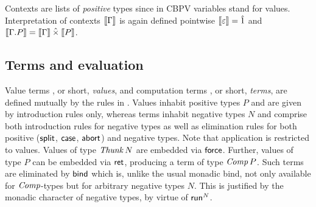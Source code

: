 \documentclass[sigplan,screen,fleqn,review]{acmart} %
\begin{document}
Contexts are lists of \emph{positive} types since in CBPV variables stand
for values.  Interpretation of contexts $\mathopen{{[\kern-0.14em[}} \Gamma \mathclose{{]\kern-0.14em]}}$ is again defined
pointwise $\mathopen{{[\kern-0.14em[}} \varepsilon \mathclose{{]\kern-0.14em]}} = \hat{1}$ and
$\mathopen{{[\kern-0.14em[}} \Gamma.P \mathclose{{]\kern-0.14em]}} = \mathopen{{[\kern-0.14em[}} \Gamma \mathclose{{]\kern-0.14em]}} \mathbin{\hat\times} \mathopen{{[\kern-0.14em[}} P \mathclose{{]\kern-0.14em]}}$.

\subsection{Terms and evaluation}

Value terms , or short, \emph{values},
and computation terms , or short,
\emph{terms}, are defined mutually by the rules in .
Values inhabit positive types $P$ and are given by introduction rules
only, whereas terms inhabit negative types $N$ and comprise both
introduction rules for negative types as well as elimination rules for
both positive ($\mathsf{split}$, $\mathsf{case}$, $\mathsf{abort}$)
and negative types.
%
%
Note
that application is restricted to values.  Values of type
$\mathit{Thunk}\,N$ are embedded via $\mathsf{force}$.
Further, values of type $P$ can be embedded
via $\mathsf{ret}$, producing a term of type $\mathit{Comp}\,P$.  Such terms are
eliminated by $\mathsf{bind}$ which is, unlike the usual monadic bind, not
only available for $\mathit{Comp}$-types but for arbitrary negative types
$N$.  This is justified by the monadic character of negative
types, by virtue of $\mathsf{run}^N$.
\end{document}
